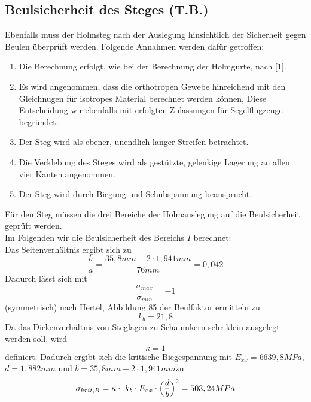\subsection{Beulsicherheit des Steges (T.B.)}
Ebenfalls muss der Holmsteg nach der Auslegung hinsichtlich der Sicherheit gegen Beulen überprüft werden. Folgende Annahmen werden dafür getroffen:\\
\begin{enumerate}
	\item Die Berechnung erfolgt, wie bei der Berechnung der Holmgurte, nach [1].
	\item Es wird angenommen, dass die orthotropen Gewebe hinreichend mit den Gleichnugen für isotropes Material berechnet werden können, Diese Entscheidung wir ebenfalls mit erfolgten Zulassungen für Segelflugzeuge begründet.
	\item Der Steg wird als ebener, unendlich langer Streifen betrachtet.
	\item Die Verklebung des Steges wird als gestützte, gelenkige Lagerung an allen vier Kanten angenommen.
	\item Der Steg wird durch Biegung und Schubspannung beansprucht.
\end{enumerate}
Für den Steg müssen die drei Bereiche der Holmauslegung auf die Beulsicherheit geprüft werden. \\
\noindent Im Folgenden wir die Beulsicherheit des Bereichs $I$ berechnet:\\
\noindent Das Seitenverhältnis ergibt sich zu 
\begin{equation}
	\frac{b}{a}=\frac{35,8 mm-2\cdot 1,941 mm}{76 mm}=0,042
\end{equation}
Dadurch lässt sich mit 
\begin{equation}
	\frac{\sigma_{max}}{\sigma_{min}}=-1
\end{equation}
(symmetrisch) nach Hertel, Abbildung 85 der Beulfaktor ermitteln zu
\begin{equation}
	k_{b} = 21,8
\end{equation}
Da das Dickenverhältnis von Steglagen zu Schaumkern sehr klein ausgelegt werden soll, wird
\begin{equation}
	\kappa = 1
\end{equation}
definiert. Dadurch ergibt sich die kritische Biegespannung mit $E_{xx}=6639,8MPa$, $d=1,882mm$ und $b=35,8mm-2\cdot 1,941mm$zu
\begin{equation}
	\sigma_{krit,B}=\kappa\cdot\ k_{b}\cdot E_{xx}\cdot\Bigl(\frac{d}{b}\Bigr)^{2}=503,24MPa
\end{equation}
